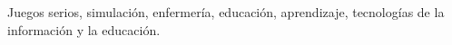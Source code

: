 \documentclass[conference]{util/IEEEtran}
\begin{document}
\begin{IEEEkeywords}
    Juegos serios, simulación, enfermería, educación, aprendizaje, tecnologías de la información y la educación. 
\end{IEEEkeywords}













\printbibliography{}
\end{document}

